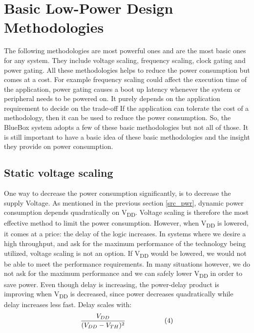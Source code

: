 \section{Basic Low-Power Design Methodologies}
 The following methodologies are most powerful ones and are the most basic ones for any system. They include voltage scaling, frequency scaling, clock gating and power gating. All these methodologies helps to reduce the power consumption but comes at a cost. For example frequency scaling could affect the execution time of the application, power gating causes a boot up latency whenever the system or peripheral needs to be powered on. It purely depends on the application requirement to decide on the trade-off If the application can tolerate the cost of a methodology, then it can be used to reduce the power consumption. So, the BlueBox system adopts a few of these basic methodologies but not all of those. It is still important to have a basic idea of these basic methodologies and the insight they provide on power consumption. 
 
 \subsection{Static voltage scaling}
 One way to decrease the power consumption significantly, is to decrease the supply Voltage. As mentioned in the previous section \ref{src_pwr}, dynamic power consumption depends quadratically on V\textsubscript{DD}. Voltage scaling is therefore the most effective method to limit the power consumption. However, when V\textsubscript{DD} is lowered, it comes at a price: the delay of the logic 
 increases. In systems where we desire a high throughput, and ask for the maximum performance of the technology being utilized, voltage scaling is not an option. If V\textsubscript{DD} would be lowered, we would not be able to meet the performance requirements. In many 
 situations however, we do not ask for the maximum performance and we can safely lower V\textsubscript{DD} in order to save power. Even though delay is increasing, the power-delay product is improving when V\textsubscript{DD} is decreased, since power decreases quadratically while delay increases less fast. Delay scales with:
 \vspace*{-2mm}
 \[ \frac{V_{DD}}{
 	(V_{DD} - V_{TH})^2
 	} \hspace{20mm}(4)\]     
 
